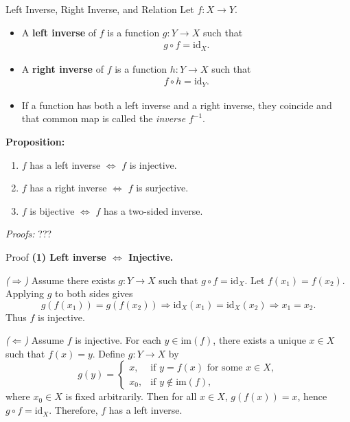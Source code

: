\begin{frame}{Left Inverse, Right Inverse, and Relation}
Let \(f: X \to Y\).

\begin{itemize}
  \item A \textbf{left inverse} of \(f\) is a function \(g: Y \to X\) such that
  \begin{align*}
    g \circ f = \mathrm{id}_X.
  \end{align*}
  \item A \textbf{right inverse} of \(f\) is a function \(h: Y \to X\) such that
  \begin{align*}
    f \circ h = \mathrm{id}_Y.
  \end{align*}
  \item If a function has both a left inverse and a right inverse, they coincide and that common map is called the \emph{inverse} \(f^{-1}\).
\end{itemize}


\textbf{Proposition:}
\begin{enumerate}
  \item \(f\) has a left inverse \(\iff\) \(f\) is injective.
  \item \(f\) has a right inverse \(\iff\) \(f\) is surjective.
  \item \(f\) is bijective \(\iff\) \(f\) has a two-sided inverse.
\end{enumerate}

\emph{Proofs:} ???
\end{frame}

\begin{frame}{Proof }
\textbf{(1) Left inverse $\Leftrightarrow$ Injective.}

\emph{($\Rightarrow$)}
Assume there exists \(g:Y\to X\) such that \(g\circ f = \mathrm{id}_X.\)
Let \(f(x_1)=f(x_2)\). Applying \(g\) to both sides gives
\[
g(f(x_1)) = g(f(x_2)) \Rightarrow \mathrm{id}_X(x_1) = \mathrm{id}_X(x_2) \Rightarrow x_1 = x_2.
\]
Thus \(f\) is injective.

\emph{($\Leftarrow$)}
Assume \(f\) is injective.
For each \(y\in\mathrm{im}(f)\), there exists a unique \(x\in X\) such that \(f(x)=y\).
Define \(g:Y\to X\) by
\[
g(y) =
\begin{cases}
x, & \text{if } y=f(x)\text{ for some }x\in X,\\[4pt]
x_0, & \text{if } y\notin\mathrm{im}(f),
\end{cases}
\]
where \(x_0\in X\) is fixed arbitrarily.
Then for all \(x\in X\), \(g(f(x))=x\), hence \(g\circ f=\mathrm{id}_X.\)
Therefore, \(f\) has a left inverse.

\end{frame}


